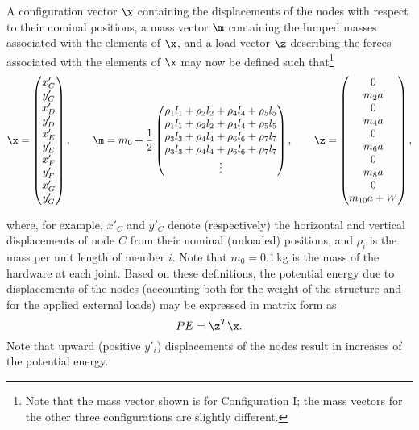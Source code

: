 \begin{exercise}
A configuration vector $\x$ containing the displacements of the
nodes with respect to their nominal positions, a mass
vector $\m$ containing the lumped masses associated
with the elements of $\x$, and a load vector $\z$ describing the
forces associated with the elements of $\x$ may now be defined such
that\footnote{Note that the mass vector shown is for
Configuration I; the mass vectors for the other three configurations
are slightly different.}
\begin{equation*}
\x = \begin{pmatrix} x'_C \\ y'_C \\ x'_D \\ y'_D \\ x'_E \\ y'_E \\ x'_F \\ y'_F \\ x'_G \\ y'_G
\end{pmatrix},
\qquad
\m = m_0 + \frac{1}{2} \begin{pmatrix} \rho_1 l_1 + \rho_2 l_2 + \rho_4 l_4 + \rho_5 l_5 \\
                                       \rho_1 l_1 + \rho_2 l_2 + \rho_4 l_4 + \rho_5 l_5 \\
                                       \rho_3 l_3 + \rho_4 l_4 + \rho_6 l_6 + \rho_7 l_7 \\
                                       \rho_3 l_3 + \rho_4 l_4 + \rho_6 l_6 + \rho_7 l_7 \\
                                         \vdots
\end{pmatrix},
\qquad
\z = \begin{pmatrix} 0 \\ m_2 a \\
                     0 \\ m_4 a \\
                     0 \\ m_6 a \\
                     0 \\ m_8 a \\
                     0 \\ m_{10} a+W
\end{pmatrix},
\end{equation*}
\clearpage

\noindent where, for example, $x'_C$ and $y'_C$ denote (respectively) the
horizontal and vertical displacements of node $C$ from their nominal
(unloaded) positions, and $\rho_i$ is the mass per unit length of
member $i$.  Note that $m_0=0.1\,$kg is the mass of the hardware at
each joint.  Based on these definitions, the potential energy due to
displacements of the nodes (accounting both for the weight of the
structure and for the applied external loads) may be expressed in
matrix form as
\begin{equation*}
\PE=\z^T \x.
\end{equation*}
Note that upward (positive $y'_i$) displacements of the nodes result in
increases of the potential energy.


\end{exercise}
